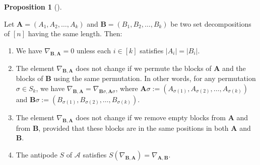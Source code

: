 \documentclass[numbers=enddot,12pt,final,onecolumn,notitlepage]{scrartcl}%
\numberwithin{exer}{subsection}
\theoremstyle{definition}
\newtheorem{prop}[theo]{Proposition}
\newenvironment{proposition}[1][]
{\begin{prop}[#1]\begin{leftbar}}
{\end{leftbar}\end{prop}}
\begin{document}
\begin{proposition}
\label{prop.row.simple}Let $\mathbf{A}=\left(  A_{1},A_{2},\ldots
,A_{k}\right)  $ and $\mathbf{B}=\left(  B_{1},B_{2},\ldots,B_{k}\right)  $ be
two set decompositions of $\left[  n\right]  $ having the same length. Then:

\begin{enumerate}
\item[\textbf{(a)}] We have $\nabla_{\mathbf{B},\mathbf{A}}=0$ unless each
$i\in\left[  k\right]  $ satisfies $\left\vert A_{i}\right\vert =\left\vert
B_{i}\right\vert $.

\item[\textbf{(b)}] The element $\nabla_{\mathbf{B},\mathbf{A}}$ does not
change if we permute the blocks of $\mathbf{A}$ and the blocks of $\mathbf{B}$
using the same permutation. In other words, for any permutation $\sigma\in
S_{k}$, we have $\nabla_{\mathbf{B},\mathbf{A}}=\nabla_{\mathbf{B}%
\sigma,\mathbf{A}\sigma}$, where $\mathbf{A}\sigma:=\left(  A_{\sigma\left(
1\right)  },A_{\sigma\left(  2\right)  },\ldots,A_{\sigma\left(  k\right)
}\right)  $ and $\mathbf{B}\sigma:=\left(  B_{\sigma\left(  1\right)
},B_{\sigma\left(  2\right)  },\ldots,B_{\sigma\left(  k\right)  }\right)  $.

\item[\textbf{(c)}] The element $\nabla_{\mathbf{B},\mathbf{A}}$ does not
change if we remove empty blocks from $\mathbf{A}$ and from $\mathbf{B}$,
provided that these blocks are in the same positions in both $\mathbf{A}$ and
$\mathbf{B}$.

\item[\textbf{(d)}] The antipode $S$ of $\mathcal{A}$ satisfies $S\left(
\nabla_{\mathbf{B},\mathbf{A}}\right)  =\nabla_{\mathbf{A},\mathbf{B}}$.
\end{enumerate}
\end{proposition}
\end{document}
